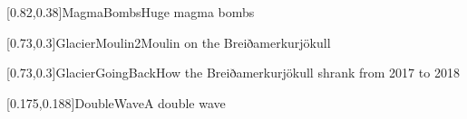 



\graphicspath{{Figures/}{Figures/Iceland/}}


\subtitle{Day 4}
\date{25 June 2026}


    
    [0.82,0.38]{MagmaBombs}{Huge magma bombs}
    
    
    [0.73,0.3]{GlacierMoulin2}{Moulin on the Breiðamerkurj\"okull}
    
    
    [0.73,0.3]{GlacierGoingBack}{How the Breiðamerkurj\"okull shrank from 2017 to 2018}
    
    [0.175,0.188]{DoubleWave}{A double wave}
    
    

